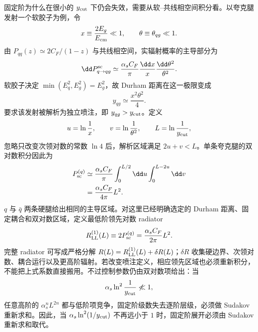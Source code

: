 \begin{exbox}
固定阶为什么在很小的 $y_{\rm cut}$ 下仍会失效，需要从软--共线相空间积分看。以夸克腿发射一个软胶子为例，令
\begin{equation*}
x\equiv\frac{2E_g}{E_{\rm cm}}\ll1,
\qquad \theta\equiv\theta_{qg}\ll1.
\end{equation*}
由 $P_{qq}(z)\simeq2C_F/(1-z)$ 与共线相空间，实辐射概率的主导部分为
\begin{equation*}
\dd P_{q\to qg}^{\rm sc}
\simeq\frac{\alpha_s C_F}{\pi}
\frac{\dd x}{x}\frac{\dd\theta^2}{\theta^2}.
\end{equation*}
软胶子决定 $\min(E_q^2,E_g^2)=E_g^2$，故 Durham 距离在这一极限变成
\begin{equation*}
y_{qg}\simeq\frac{x^2\theta^2}{4}.
\end{equation*}
要求该发射被解析为独立喷注，即 $y_{qg}>y_{\rm cut}$。定义
\begin{equation*}
u=\ln\frac1x,\qquad v=\ln\frac1{\theta^2},\qquad L=\ln\frac1{y_{\rm cut}},
\end{equation*}
忽略只改变次领对数的常数 $\ln4$ 后，解析区域满足 $2u+v<L$。单条夸克腿的双对数积分因此为
\begin{align*}
P_{\rm sc}^{(q)}
&\simeq\frac{\alpha_s C_F}{\pi}
\int_0^{L/2}\dd u\int_0^{L-2u}\dd v\\
&=\frac{\alpha_s C_F}{4\pi}L^2.
\end{align*}
$q$ 与 $\bar q$ 两条硬腿给出相同的主导区域。对这里已经明确选定的 Durham 距离、固定耦合和双对数区域，定义最低阶领先对数 radiator
\begin{equation*}
R_{\rm LL}^{(1)}(L)
\equiv2P_{\rm sc}^{(q)}
=\frac{\alpha_s C_F}{2\pi}L^2.
\end{equation*}
完整 radiator 可写成严格分解 $R(L)=R_{\rm LL}^{(1)}(L)+\delta R(L)$；$\delta R$ 收集硬边界、次领对数、耦合运行以及更高阶辐射。若改变喷注定义，相应领先区域也必须重新积分，不能把上式系数直接搬用。不过控制参数仍由双对数项给出：当
\begin{equation*}
\alpha_s\ln^2\frac1{y_{\rm cut}}\not\ll1,
\end{equation*}
任意高阶的 $\alpha_s^nL^{2n}$ 都与低阶项竞争，固定阶级数失去逐阶层级，必须做 Sudakov 重新求和。因此，当 $\alpha_s\ln^2(1/y_{\rm cut})$ 不再远小于 $1$ 时，固定阶展开必须由 Sudakov 重新求和取代。
\end{exbox}






